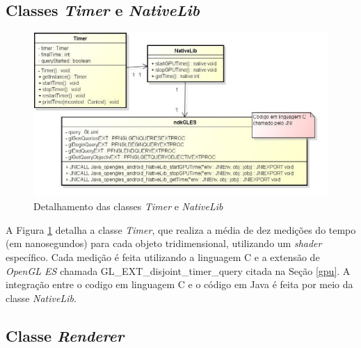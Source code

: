 	\subsection{Classes \textit{Timer} e \textit{NativeLib}}      

	\begin{figure}[h]
	\centering
		\includegraphics[keepaspectratio=true,scale=0.6]{figuras/timer_nativelib.jpg}
	\caption{Detalhamento das classes \textit{Timer} e \textit{NativeLib}}
	\label{timer_nativelib}
	\end{figure}

	A Figura \ref{timer_nativelib} detalha a classe \textit{Timer}, que realiza a média de dez medições do tempo (em nanosegundos) para cada objeto tridimensional, utilizando um \textit{shader} específico. Cada medição é feita utilizando a linguagem C e a extensão de \textit{OpenGL ES} chamada GL\_EXT\_disjoint\_timer\_query citada na Seção \ref{gpu}.  A integração entre o codigo em linguagem C e o código em Java é feita por meio da classe \textit{NativeLib}.

	\subsection{Classe \textit{Renderer}}    

